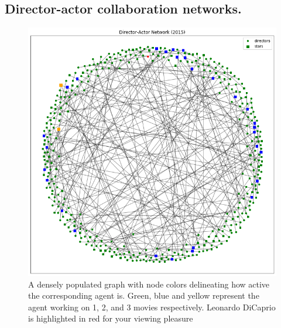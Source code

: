 \documentclass{article}
\begin{document}
\subsection{Director-actor collaboration networks.}

\begin{figure}
    \centering
    \includegraphics[scale=0.35]{figures/Director_Actor_Network_2015.png}
    \caption{A densely populated graph with node colors delineating how active the corresponding agent is. Green, blue and yellow represent the agent working on 1, 2, and 3 movies respectively. Leonardo DiCaprio is highlighted in red for your viewing pleasure}
    \label{fig:t-graph-fig}
\end{figure}
\end{document}
